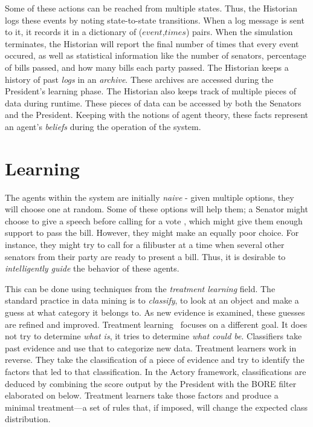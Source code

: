 \documentclass{sig-alternate}
\begin{document}
Some of these actions can be reached from multiple states. Thus, the 
Historian logs these events by noting state-to-state transitions. 
When a log message is sent to it, it records it in a dictionary of ($event$,$times$) pairs. When the simulation terminates, the Historian
will report the final number of times that every event occured, as 
well as statistical information like the number of senators, percentage
of bills passed, and how many bills each party passed. The Historian 
keeps a history of past {\em logs} in an {\em archive}. These archives
are accessed during the President's learning phase. The Historian also
keeps track of multiple pieces of data during runtime. These pieces of 
data can be accessed by both the Senators and the President. Keeping
with the notions of agent theory, these facts represent an agent's 
{\em beliefs} during the operation of the system.    

\section{Learning}

The agents within the system are initially {\em naive} - given multiple
options, they will choose one at random. Some of these options will help
them; a Senator might choose to give a speech before calling for a vote
, which might give them enough support to pass the bill. However, they
might make an equally poor choice. For instance, they might try
to call for a filibuster at a time when several other senators from 
their party are ready to present a bill. Thus, it is desirable to
{\em intelligently guide} the behavior of these agents.

This can be done using techniques from the {\em treatment
learning} field. The standard practice in data mining is to {\em classify}, to look at an object and make a guess 
at what category it belongs to. As new evidence is examined, these guesses are refined and improved. Treatment learning~\cite{me03c} focuses on a different goal. It does not try to determine {\em what is}, it tries to determine {\em what could be}. 
Classifiers take past evidence and use that to categorize new data. Treatment learners work in reverse. They take the classification of a
piece of evidence and try to identify the factors that led to that classification. In the Actory framework, classifications are deduced by
combining the score output by the President with the BORE
filter elaborated on below. Treatment learners take those factors and produce a
minimal treatment---a set of rules that, if imposed, will change the expected class distribution. 
\end{document}
